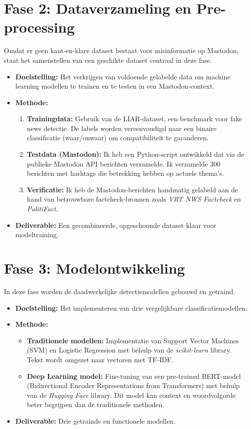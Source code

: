 \documentclass[a4paper,11pt]{report}
\begin{document}
\section{Fase 2: Dataverzameling en Pre-processing}
Omdat er geen kant-en-klare dataset bestaat voor misinformatie op Mastodon, staat het samenstellen van een geschikte dataset centraal in deze fase.
\begin{itemize}
    \item \textbf{Doelstelling:} Het verkrijgen van voldoende gelabelde data om machine learning modellen te trainen en te testen in een Mastodon-context.
    \item \textbf{Methode:}
    \begin{enumerate}
        \item \textbf{Trainingdata:} Gebruik van de LIAR-dataset, een benchmark voor fake news detectie. De labels worden vereenvoudigd naar een binaire classificatie (waar/onwaar) om compatibiliteit te garanderen.
        \item \textbf{Testdata (Mastodon):} Ik heb een Python-script ontwikkeld dat via de publieke Mastodon API berichten verzamelde. Ik verzamelde 300 berichten met hashtags die betrekking hebben op actuele thema's.
        \item \textbf{Verificatie:} Ik heb de Mastodon-berichten handmatig gelabeld aan de hand van betrouwbare factcheck-bronnen zoals \textit{VRT NWS Factcheck} en \textit{PolitiFact}.
    \end{enumerate}
    \item \textbf{Deliverable:} Een gecombineerde, opgeschoonde dataset klaar voor modeltraining.
\end{itemize}

\section{Fase 3: Modelontwikkeling}
In deze fase worden de daadwerkelijke detectiemodellen gebouwd en getraind.
\begin{itemize}
    \item \textbf{Doelstelling:} Het implementeren van drie vergelijkbare classificatiemodellen.
    \item \textbf{Methode:}
    \begin{itemize}
        \item \textbf{Traditionele modellen:} Implementatie van Support Vector Machines (SVM) en Logistic Regression met behulp van de \textit{scikit-learn} library. Tekst wordt omgezet naar vectoren met TF-IDF.
        \item \textbf{Deep Learning model:} Fine-tuning van een pre-trained BERT-model (Bidirectional Encoder Representations from Transformers) met behulp van de \textit{Hugging Face} library. Dit model kan context en woordvolgorde beter begrijpen dan de traditionele methoden.
    \end{itemize}
    \item \textbf{Deliverable:} Drie getrainde en functionele modellen.
\end{itemize}
\end{document}
